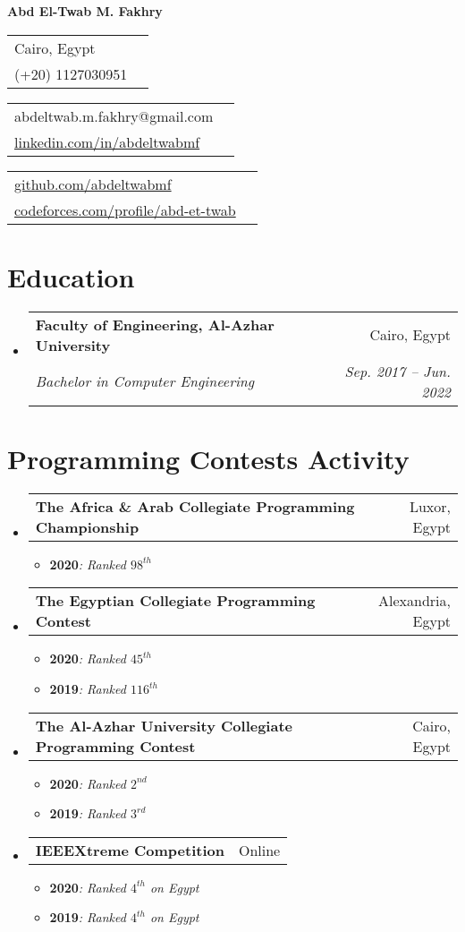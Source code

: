 \documentclass[letterpaper, 11pt]{article}
\makeatletter
\newcommand{\cItem}[2]{\item\small{\textbf{#1}{\textit{#2} \vspace{-2pt}}}}
\newcommand{\SubSecListBeg}{\begin{itemize}[leftmargin=*]}
\newcommand{\SubSecListEnd}{\end{itemize}}
\newcommand{\ItemListBeg}{\begin{itemize}}
\newcommand{\ItemListEnd}{\end{itemize}\vspace{-5pt}}
\newcommand{\subsecfourtwoitalic}[4] {
	\vspace{-1pt}\item
	\begin{tabular*}{0.97\textwidth}[t]{l@{\extracolsep{\fill}}r}
		\textbf{#1} & #2 \\
		\textit{\small#3} & \textit{\small #4} \\
	\end{tabular*}\vspace{-5pt}
}
\newcommand{\subsectwonormal}[2] {
	\vspace{-1pt}\item
	\begin{tabular*}{0.97\textwidth}[t]{l@{\extracolsep{\fill}}r}
		\textbf{#1} & #2 \\
	\end{tabular*}\vspace{-5pt}
}
\newcommand{\linktable}[4] {
	\begin{tabular}{lr}
	#1 #2 \\
	#3 #4 \\
	\end{tabular}
}
\makeatother
\begin{document}
\textbf{\Huge Abd El-Twab M. Fakhry} \\

\begin{minipage}[t]{0.10\textwidth}
	\linktable
	{\faIcon{location-arrow}} {Cairo, Egypt}
	{\faIcon{mobile-alt}}     {(+20) 1127030951}
\end{minipage}
\hfill
\begin{minipage}[t]{0.20\textwidth}
	\linktable
	{\faIcon{envelope}} {abdeltwab.m.fakhry@gmail.com}
	{\faIcon{linkedin}} {\href{https://www.linkedin.com/in/abdeltwabmf/}{linkedin.com/in/abdeltwabmf}}
\end{minipage}
\hfill
\begin{minipage}[t]{0.35\textwidth}
	\linktable
	{\faIcon{github}} {\href{https://github.com/AbdeltwabMF}{github.com/abdeltwabmf}}
	{\faIcon{code}}   {\href{https://codeforces.com/profile/Abd-Et-Twab}{codeforces.com/profile/abd-et-twab}}
\end{minipage}


\section{Education}
\SubSecListBeg
	\subsecfourtwoitalic
	{\faIcon{university} Faculty of Engineering, Al-Azhar University} {Cairo, Egypt}
	{Bachelor in Computer Engineering}                                {Sep. 2017 -- Jun. 2022}
\SubSecListEnd

\section{Programming Contests Activity}
\SubSecListBeg
	\subsectwonormal
	{The Africa \& Arab Collegiate Programming Championship}{Luxor, Egypt}
	\ItemListBeg
		\cItem
		{2020}{: Ranked $98^{th}$}
	\ItemListEnd
	\subsectwonormal
	{The Egyptian Collegiate Programming Contest}{Alexandria, Egypt}
	\ItemListBeg
		\cItem
		{2020}{: Ranked $45^{th}$}
		\cItem
		{2019}{: Ranked $116^{th}$}
	\ItemListEnd
	\subsectwonormal
	{The Al-Azhar University Collegiate Programming Contest}{Cairo, Egypt}
	\ItemListBeg
		\cItem
		{2020}{: Ranked $2^{nd}$}
		\cItem
		{2019}{: Ranked $3^{rd}$}
	\ItemListEnd
	\subsectwonormal
	{IEEEXtreme Competition}{Online}
	\ItemListBeg
		\cItem
		{2020}{: Ranked $4^{th}$ on Egypt}
		\cItem
		{2019}{: Ranked $4^{th}$ on Egypt}
	\ItemListEnd
\SubSecListEnd


\end{document}

